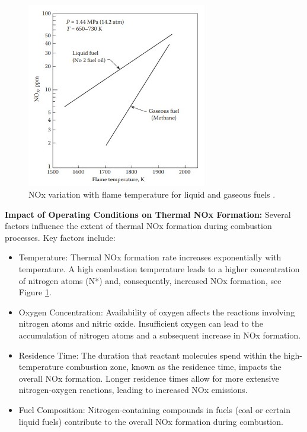 \begin{figure}[h]
	\centering
	\includegraphics[width=0.7\textwidth]{Chapter1/Images/NoxVsTemp.jpeg}
	\caption[NOx variation with flame temperature for liquid and gaseous fuels]{NOx variation with flame temperature for liquid and gaseous fuels \cite{94-GT-283}.}
	\label{NoxVsTemp}
\end{figure}

\textbf{Impact of Operating Conditions on Thermal NOx Formation:}
Several factors influence the extent of thermal NOx formation during combustion processes. Key factors include:
\begin{itemize}
    \item Temperature: Thermal NOx formation rate increases exponentially with temperature. A high combustion temperature leads to a higher concentration of nitrogen atoms (N*) and, consequently, increased NOx formation, see Figure \ref{NoxVsTemp}.
    \item Oxygen Concentration: Availability of oxygen affects the reactions involving nitrogen atoms and nitric oxide. Insufficient oxygen can lead to the accumulation of nitrogen atoms and a subsequent increase in NOx formation.
    \item Residence Time: The duration that reactant molecules spend within the high-temperature combustion zone, known as the residence time, impacts the overall NOx formation. Longer residence times allow for more extensive nitrogen-oxygen reactions, leading to increased NOx emissions.
    \item Fuel Composition: Nitrogen-containing compounds in fuels (coal or certain liquid fuels) contribute to the overall NOx formation during combustion.
\end{itemize}

